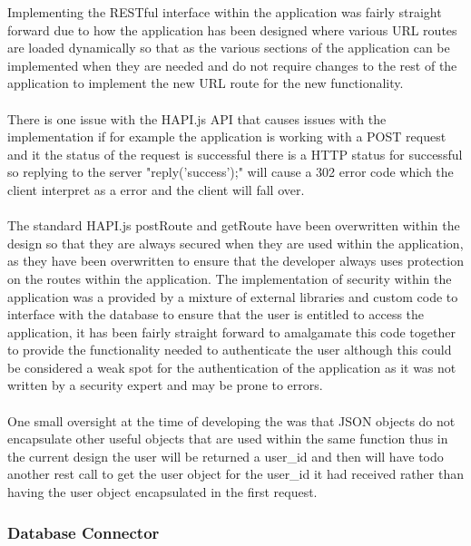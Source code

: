 Implementing the RESTful interface within the application was fairly straight forward due to how the application has been designed where various URL routes are loaded dynamically so that as the various sections of the application can be implemented when they are needed and do not require changes to the rest of the application to implement the new URL route for the new functionality.\\
\\
There is one issue with the HAPI.js API that causes issues with the implementation if for example the application is working with a POST request and it the status of the request is successful there is a HTTP status for successful so replying to the server "reply('success');" will cause a 302 error code which the client interpret as a error and the client will fall over.\\
\\
The standard HAPI.js postRoute and getRoute have been overwritten within the design so that they are always secured when they are used within the application, as they have been overwritten to ensure that the developer always uses protection on the routes within the application. The implementation of security within the application was a provided by a mixture of external libraries and custom code to interface with the database to ensure that the user is entitled to access the application, it has been fairly straight forward to amalgamate this code together to provide the functionality needed to authenticate the user although this could be considered a weak spot for the authentication of the application as it was not written by a security expert and may be prone to errors.\\
\\
One small oversight at the time of developing the was that JSON objects do not encapsulate other useful objects that are used within the same function thus in the current design the user will be returned a user\_id and then will have todo another rest call to get the user object for the user\_id it had received rather than having the user object encapsulated in the first request.

\subsubsection{Database Connector}

